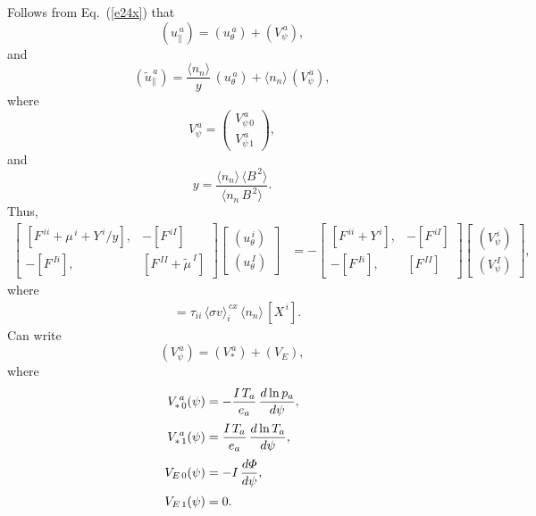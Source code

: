 \documentclass[12pt]{article}
\begin{document}
Follows from Eq.~(\ref{e24x}) that
\begin{equation}
 (u_{\parallel}^{\,a})  = (u_\theta^{\,a}) + (V_\psi^{\,a}),
\end{equation}
and
\begin{equation}
 (\tilde{u}_{\parallel}^{\,a})  = \frac{\langle n_n\rangle}{y}\,(u_\theta^{\,a}) + \langle n_n\rangle\,(V_\psi^{\,a}),
\end{equation}
where
\begin{equation}
V_\psi^{\,a} = \left(\begin{array}{c}V_{\psi\,0}^{\,a}\\[1ex]
V_{\psi\,1}^{\,a}\end{array}\right),
\end{equation}
and\
\begin{equation}
y = \frac{\langle n_n\rangle\,\langle B^{\,2}\rangle}{\langle n_n\,B^{\,2}\rangle}.
\end{equation}
Thus, 
\begin{align}\label{emode}
\left[\begin{array}{rr} [F^{\,ii}+\mu^{\,i}+Y^{\,i}/y], & -[F^{\,iI}]\\[0.5ex] -[F^{\,Ii}], & [F^{\,II}+\tilde{\mu}^{\,I}]\end{array}\right]
\left[\begin{array}{c}(u_\theta^{\,i}) \\[0.5ex] (u_\theta^{\,I})\end{array}\right]
&= -\left[\begin{array}{rr} [F^{\,ii}+Y^{\,i}], & -[F^{\,iI}]\\[0.5ex] -[F^{\,Ii}], & [F^{\,II}]\end{array}\right]
\left[\begin{array}{c} (V_\psi^{\,i})\\[0.5ex]
(V_\psi^{\,I})\end{array}\right],
\end{align}
where
\begin{align}
[Y^{\,i}] &= \tau_{ii}\,\langle\sigma v\rangle_i^{\,cx}\,\langle n_n\rangle \,[X^{\,i}].
\end{align}
Can write
\begin{equation}
(V_\psi^{\,a}) = (V_\ast^{\,a}) + (V_E),
\end{equation}
where
\begin{align}
V_{\ast\,0}^{\,a}(\psi) &=
- \frac{I\,T_a}{e_a}\,\frac{d \ln p_a}{d\psi},\\[0.5ex]
V_{\ast\,1}^{\,a}(\psi) &= \frac{I\,T_a}{e_a}\,\frac{d\ln T_a}{d\psi},\\[0.5ex]
V_{E\,0}(\psi) &=- I\,\frac{d{\mit\Phi}}{d\psi},\\[0.5ex]
V_{E\,1}(\psi) &= 0.
\end{align}
\end{document}
